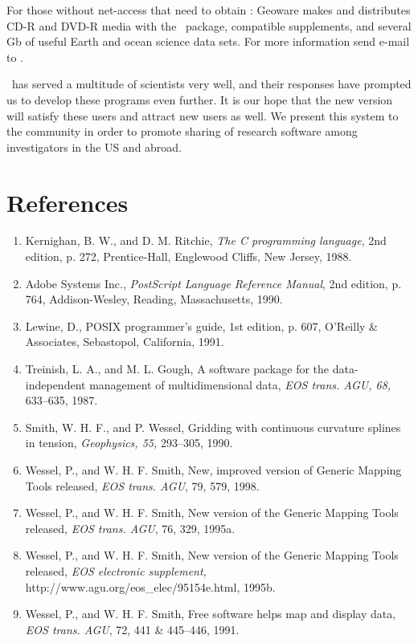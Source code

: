 For those without net-access that need to obtain \GMT: Geoware
makes and distributes CD-R and DVD-R media with the \GMT\ package, compatible supplements, and
several Gb of useful Earth and ocean science data sets.  For more information send e-mail to
. 

\GMT\ has served a multitude of scientists very well, and their responses
have prompted us to develop these programs even further.  It is our
hope that the new version will satisfy these users and attract new
users as well.  We present this system to the community in order to
promote sharing of research software among investigators in the US
and abroad. 

\section*{References}

\begin{enumerate}
\item Kernighan, B. W., and D. M. Ritchie, \emph{The C programming language},
2nd edition, p. 272, Prentice-Hall, Englewood Cliffs, New Jersey, 1988.

\item Adobe Systems Inc., \emph{PostScript Language Reference Manual},
2nd edition, p. 764, Addison-Wesley, Reading, Massachusetts, 1990.

\item Lewine, D., POSIX programmer's guide, 1st edition, p. 607, O'Reilly
\& Associates, Sebastopol, California, 1991. 

\item Treinish, L. A., and M. L. Gough, A software package for the
data-independent management of multidimensional data,
\emph{EOS trans. AGU, 68, }633--635, 1987.

\item Smith, W. H. F., and P. Wessel, Gridding with continuous curvature
splines in tension, \emph{Geophysics, 55, }293--305, 1990. 

\item Wessel, P., and W. H. F. Smith, New, improved version of Generic
Mapping Tools released, \emph{EOS trans. AGU}, 79, 579, 1998. 

\item Wessel, P., and W. H. F. Smith, New version of the Generic
Mapping Tools released, \emph{EOS trans. AGU}, 76, 329, 1995a. 

\item Wessel, P., and W. H. F. Smith, New version of the Generic
Mapping Tools released, \emph{EOS electronic supplement, }
http://www.agu.org/eos\_elec/95154e.html, 1995b. 

\item Wessel, P., and W. H. F. Smith, Free software helps map and
display data, \emph{EOS trans. AGU}, 72, 441 \& 445--446, 1991. 

\end{enumerate}
